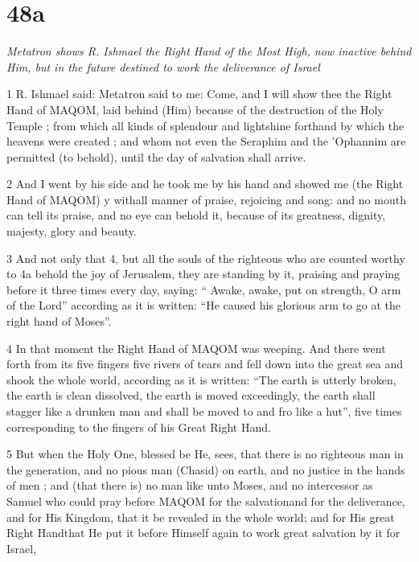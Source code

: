 \chapter{48a}

\par \textit{Metatron shows R. Ishmael the Right Hand of the Most High, now inactive behind Him, but in the future destined to work the deliverance of Israel}

\par 1 R. Ishmael said: Metatron said to me: Come, and I will show thee the Right Hand of MAQOM, laid behind (Him) because of the destruction of the Holy Temple ; from which all kinds of splendour and lightshine forthand by which the heavens were created ; and whom not even the Seraphim and the 'Ophannim are permitted (to behold), until the day of salvation shall arrive. 

\par 2 And I went by his side and he took me by his hand and showed me (the Right Hand of MAQOM) y withall manner of praise, rejoicing and song: and no mouth can tell its praise, and no eye can behold it, because of its greatness, dignity, majesty, glory and beauty. 

\par 3 And not only that 4, but all the souls of the righteous who are counted worthy to 4a behold the joy of Jerusalem, they are standing by it, praising and praying before it three times every day, saying: “ Awake, awake, put on strength, O arm of the Lord” according as it is written: “He caused his glorious arm to go at the right hand of Moses”. 

\par 4 In that moment the Right Hand of MAQOM was weeping. And there went forth from its five fingers five rivers of tears and fell down into the great sea and shook the whole world, according as it is written: “The earth is utterly broken, the earth is clean dissolved, the earth is moved exceedingly, the earth shall stagger like a drunken man and shall be moved to and fro like a hut”, five times corresponding to the fingers of his Great Right Hand. 

\par 5 But when the Holy One, blessed be He, sees, that there is no righteous man in the generation, and no pious man (Chasid) on earth, and no justice in the hands of men ; and (that there is) no man like unto Moses, and no intercessor as Samuel who could pray before MAQOM for the salvationand for the deliverance, and for His Kingdom, that it be revealed in the whole world; and for His great Right Handthat He put it before Himself again to work great salvation by it for Israel, 

